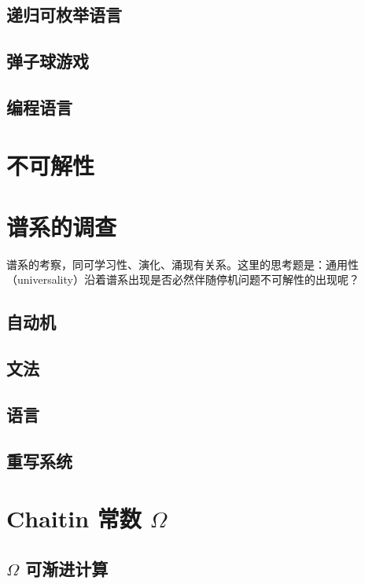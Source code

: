 \documentclass[a4paper,12pt]{article}
\numberwithin{problem}{section}
\numberwithin{definition}{section}
\numberwithin{lemma}{section}
\numberwithin{proposition}{section}
\numberwithin{theorem}{section}
\numberwithin{grammar}{section}
\numberwithin{program}{section}
\numberwithin{convention}{section}
\numberwithin{corollary}{section}
\begin{document}
\subsection{递归可枚举语言}

\subsection{弹子球游戏}

\subsection{编程语言}

\newpage

\section{不可解性}

\newpage

\section{谱系的调查}

谱系的考察，同可学习性、演化、涌现有关系。这里的思考题是：通用性（universality）沿着谱系出现是否必然伴随停机问题不可解性的出现呢？

\subsection{自动机}

\subsection{文法}

\subsection{语言}

\subsection{重写系统}

\newpage

\section{Chaitin 常数 $\Omega$}

\subsection{$\Omega$ 可渐进计算}
\end{document}
